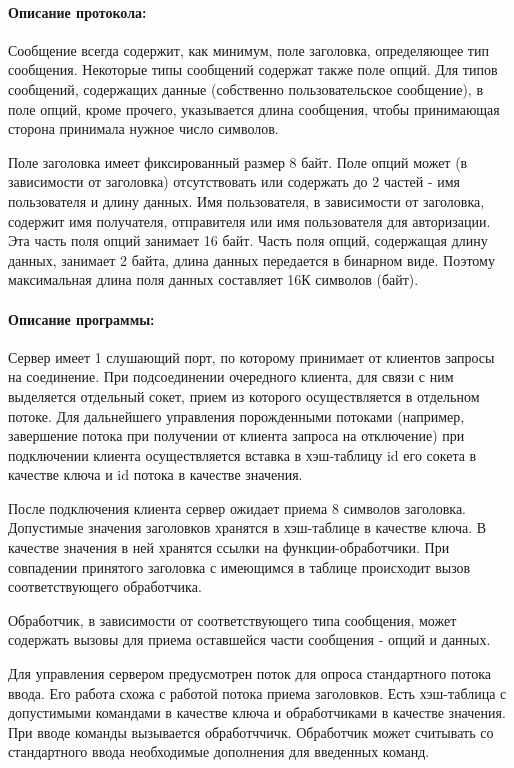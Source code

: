\paragraph{Описание протокола:}

Сообщение всегда содержит, как минимум, поле заголовка, определяющее тип сообщения. Некоторые типы сообщений содержат также поле опций. Для типов сообщений, содержащих данные (собственно пользовательское сообщение), в поле опций, кроме прочего, указывается длина сообщения, чтобы принимающая сторона принимала нужное число символов.

Поле заголовка имеет фиксированный размер 8 байт. Поле опций может (в зависимости от заголовка) отсутствовать или содержать до 2 частей - имя пользователя и длину данных. Имя пользователя, в зависимости от заголовка, содержит имя получателя, отправителя или имя пользователя для авторизации. Эта часть поля опций занимает 16 байт. Часть поля опций, содержащая длину данных, занимает 2 байта, длина данных передается в бинарном виде. Поэтому максимальная длина поля данных составляет 16К символов (байт).

\paragraph{Описание программы:}

Сервер имеет 1 слушающий порт, по которому принимает от клиентов запросы на соединение. При подсоединении очередного клиента, для связи с ним выделяется отдельный сокет, прием из которого осуществляется в отдельном потоке. Для дальнейшего управления порожденными потоками (например, завершение потока при получении от клиента запроса на отключение) при подключении клиента осуществляется вставка в хэш-таблицу id его сокета в качестве ключа и id потока в качестве значения.

После подключения клиента сервер ожидает приема 8 символов заголовка. Допустимые значения заголовков хранятся в хэш-таблице в качестве ключа. В качестве значения в ней хранятся ссылки на функции-обработчики. При совпадении принятого заголовка с имеющимся в таблице происходит вызов соответствующего обработчика.

Обработчик, в зависимости от соответствующего типа сообщения, может содержать вызовы для приема оставшейся части сообщения - опций и данных.

Для управления сервером предусмотрен поток для опроса стандартного потока ввода. Его работа схожа с работой потока приема заголовков. Есть хэш-таблица с допустимыми командами в качестве ключа и обработчиками в качестве значения. При вводе команды вызывается обработччичк. Обработчик может считывать со стандартного ввода необходимые дополнения для введенных команд.

